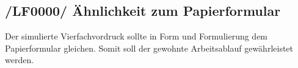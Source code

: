 \subsection{/LF0000/ Ähnlichkeit zum Papierformular}
Der simulierte Vierfachvordruck sollte in Form und Formulierung dem Papierformular gleichen. Somit soll der gewohnte Arbeitsablauf gewährleistet werden. 